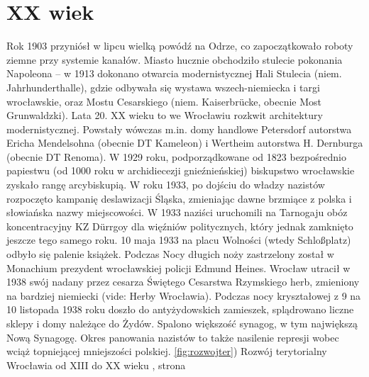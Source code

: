 \documentclass{article}
\begin{document}
\section{XX wiek}
\vspace{3mm} %
\newline Rok 1903 przyniósł w lipcu wielką powódź na Odrze, co zapoczątkowało roboty ziemne przy systemie kanałów.
\vspace{3mm} %
\newline Miasto hucznie obchodziło stulecie pokonania Napoleona – w 1913 dokonano otwarcia modernistycznej Hali Stulecia (niem. Jahrhunderthalle), gdzie odbywała się wystawa wszech-niemiecka i targi wrocławskie, oraz Mostu Cesarskiego (niem. Kaiserbrücke, obecnie Most Grunwaldzki).
\vspace{3mm} %
\newline Lata 20. XX wieku to we Wrocławiu rozkwit architektury modernistycznej. Powstały wówczas m.in. domy handlowe Petersdorf autorstwa Ericha Mendelsohna (obecnie DT Kameleon) i Wertheim autorstwa H. Dernburga (obecnie DT Renoma). W 1929 roku, podporządkowane od 1823 bezpośrednio papiestwu (od 1000 roku w archidiecezji gnieźnieńskiej) biskupstwo wrocławskie zyskało rangę arcybiskupią.
\vspace{3mm} %
\newline W roku 1933, po dojściu do władzy nazistów rozpoczęto kampanię deslawizacji Śląska, zmieniając dawne brzmiące z polska i słowiańska nazwy miejscowości. W 1933 naziści uruchomili na Tarnogaju obóz koncentracyjny KZ Dürrgoy dla więźniów politycznych, który jednak zamknięto jeszcze tego samego roku. 10 maja 1933 na placu Wolności (wtedy Schloßplatz) odbyło się palenie książek. Podczas Nocy długich noży zastrzelony został w Monachium prezydent wrocławskiej policji Edmund Heines. Wrocław utracił w 1938 swój nadany przez cesarza Świętego Cesarstwa Rzymskiego herb, zmieniony na bardziej niemiecki (vide: Herby Wrocławia). Podczas nocy kryształowej z 9 na 10 listopada 1938 roku doszło do antyżydowskich zamieszek, splądrowano liczne sklepy i domy należące do Żydów. Spalono większość synagog, w tym największą Nową Synagogę.
\vspace{3mm} %
\newline Okres panowania nazistów to także nasilenie represji wobec wciąż topniejącej mniejszości polskiej.
\newline\ref{fig:rozwojter}) Rozwój terytorialny Wrocławia od XIII do XX wieku , strona \pageref{fig:rozwojter}
\end{document}
